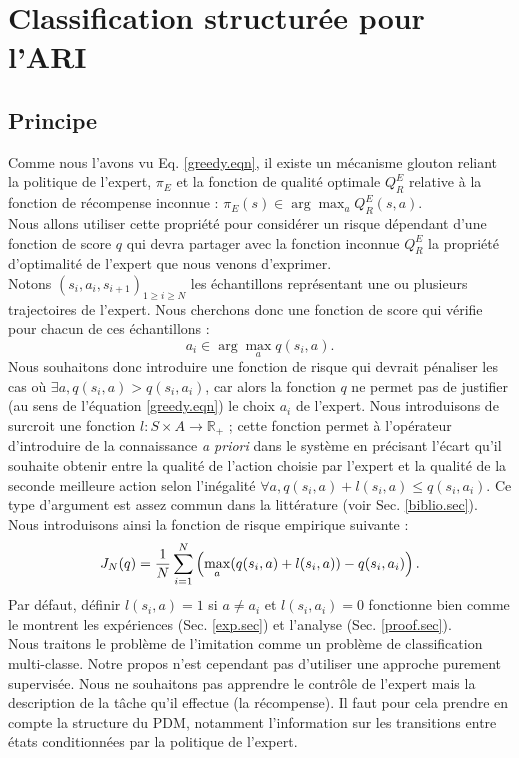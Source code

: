 \documentclass[publibook-draft]{CAp2012}
\begin{document}
\section{Classification structurée pour l'ARI}
\subsection{Principe}
Comme nous l'avons vu Eq. \eqref{greedy.eqn}, il existe un mécanisme glouton reliant la politique de l'expert, $\pi_E$ et la fonction de qualité optimale $Q^E_R$ relative à la fonction de récompense inconnue : $\pi_E(s) \in \arg\max_aQ^E_R(s,a)$.\\
Nous allons utiliser cette propriété pour considérer un risque dépendant d'une fonction de score $q$ qui devra partager avec la fonction inconnue $Q^E_R$ la propriété d'optimalité de l'expert que nous venons d'exprimer.\\
Notons $(s_i,a_i,s_{i+1})_{1\geq i\geq N}$ les échantillons représentant une ou plusieurs trajectoires de l'expert. Nous cherchons donc une fonction de score qui vérifie pour chacun de ces échantillons :
\begin{equation}
\label{butLAFEM.eqn}
a_i \in \arg\max_aq(s_i,a).
\end{equation}
Nous souhaitons donc introduire une fonction de risque qui devrait pénaliser les cas où $\exists a, q(s_i,a)>q(s_i,a_i)$, car alors la fonction $q$ ne permet pas de justifier (au sens de l'équation \eqref{greedy.eqn}) le choix $a_i$ de l'expert. Nous introduisons de surcroit une fonction $l : S \times A \rightarrow \mathbb{R}_+$ ; cette fonction permet à l'opérateur d'introduire de la connaissance \emph{a priori} dans le système en précisant l'écart qu'il souhaite obtenir entre la qualité de l'action choisie par l'expert et la qualité de la seconde meilleure action selon l'inégalité $\forall a, q(s_i,a) + l(s_i,a) \leq q(s_i,a_i)$. Ce type d'argument est assez commun dans la littérature (voir Sec. \ref{biblio.sec}). Nous introduisons ainsi la fonction de risque empirique suivante :
  \begin{equation}
\label{Jdef.eqn}
   J_N(q) = {1\over N} \sum_{i=1}^N\left(\max_{a}(q(s_i,a) + l(s_i,a)) - q(s_i,a_i) \right).
   \end{equation}
Par défaut, définir $l(s_i,a) = 1$ si $a\neq a_i$ et $l(s_i,a_i)=0$ fonctionne bien comme le montrent les expériences (Sec. \ref{exp.sec}) et l'analyse (Sec. \ref{proof.sec}).\\

Nous traitons le problème de l'imitation comme un problème de classification multi-classe. Notre propos n'est cependant pas d'utiliser une approche purement supervisée. Nous ne souhaitons pas apprendre le contrôle de l'expert mais la description de la tâche qu'il effectue (la récompense). Il faut pour cela prendre en compte la structure du PDM, notamment l'information sur les transitions entre états conditionnées par la politique de l'expert.\\
\end{document}
